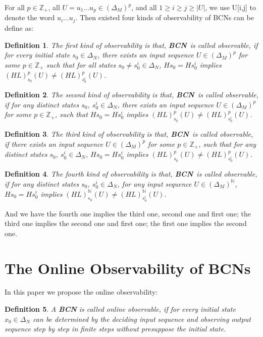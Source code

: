 \documentclass[letterpaper, 10 pt, conference]{ieeeconf}  %
\newtheorem{definition}{Definition}
\def \BCN {{\bf BCN}}
\begin{document}
For all  $p\in \mathbb{Z}_+$, all $U=u_1 ... u_p \in(\Delta_M)^p$, and all $1\ge i \ge j \ge |U|$, we use U[i,j] to denote the word $u_i ... u_j$. Then existed four kinds of observability of BCNs can be define as: 
\begin{definition}
The first kind of observability is that, \BCN\ is called observable, if for every initial state $s_0 \in \Delta_N$, there exists an input sequence $U\in(\Delta_M)^p$ for some $p\in \mathbb{Z}_+$ such that for all states $s_0\neq s^i_0\in \Delta_N$, $Hs_0=Hs^i_0$ implies $(HL)^p_{s_0}(U)\neq (HL)^p_{s^i_0}(U)$.
\end{definition}
\begin{definition}
	The second kind of observability is that, \BCN\ is called observable, if for any distinct states $s_0$, $s^i_0 \in \Delta_N$, there exists an input sequence $U\in(\Delta_M)^p$ for some $p\in \mathbb{Z}_+$, such that $Hs_0=Hs^i_0$ implies $(HL)^p_{s_0}(U)\neq (HL)^p_{s^i_0}(U)$.
\end{definition}
\begin{definition}
	The third kind of observability is that, \BCN\ is called observable, if there exists an input sequence $U\in(\Delta_M)^p$ for some $p\in \mathbb{Z}_+$, such that for any distinct states $s_0$, $s^i_0 \in \Delta_N$, $Hs_0=Hs^i_0$ implies $(HL)^p_{s_0}(U)\neq (HL)^p_{s^i_0}(U)$.
\end{definition}
\begin{definition}
	The fourth kind of observability is that, \BCN\ is called observable, if for any distinct states $s_0$, $s^i_0 \in \Delta_N$, for any input sequence $U\in(\Delta_M)^{\mathbb{N}}$, $Hs_0=Hs^i_0$ implies $(HL)^{\mathbb{N}}_{s_0}(U)\neq (HL)^{\mathbb{N}}_{s^i_0}(U)$.
\end{definition}

And we have the fourth one implies the third one, second one and first one; the third one implies the second one and first one; the first one implies the second one. 
\section{The Online Observability of BCNs}
In this paper we propose the online observability: 

\begin{definition}
	A {\bf BCN} is called online observable, if for every initial state $x_0 \in \Delta_N$ can be determined by the deciding input sequence and observing output sequence step by step in finite steps without presuppose the  initial state.
\end{definition}
\end{document}
